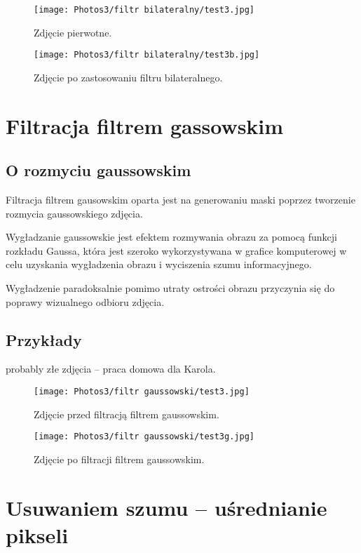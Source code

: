 \documentclass[]{mwart}
\begin{document}
\begin{figure}[H]
    \centering
    \texttt{[image: Photos3/filtr bilateralny/test3.jpg]}
    \caption{Zdjęcie pierwotne.}
\end{figure}
\begin{figure}[H]
    \centering
    \texttt{[image: Photos3/filtr bilateralny/test3b.jpg]}
    \caption{Zdjęcie po zastosowaniu filtru bilateralnego.}
\end{figure}






\section{Filtracja filtrem gassowskim           }
\subsection{O rozmyciu gaussowskim}
Filtracja filtrem gausowskim oparta jest na generowaniu maski poprzez tworzenie rozmycia gaussowskiego zdjęcia.

Wygładzanie gaussowskie jest efektem rozmywania obrazu za pomocą funkcji rozkładu Gaussa,
która jest szeroko wykorzystywana w grafice komputerowej w celu uzyskania wygładzenia obrazu i wyciszenia szumu informacyjnego.

Wygładzenie paradoksalnie pomimo utraty ostrości obrazu przyczynia się do poprawy wizualnego odbioru zdjęcia.

\subsection{Przykłady}
probably złe zdjęcia -- praca domowa dla Karola.

\begin{figure}[H]
    \centering
    \texttt{[image: Photos3/filtr gaussowski/test3.jpg]}
    \caption{Zdjęcie przed filtracją filtrem gaussowskim.}
\end{figure}
\begin{figure}[H]
    \centering
    \texttt{[image: Photos3/filtr gaussowski/test3g.jpg]}
    \caption{Zdjęcie po filtracji filtrem gaussowskim.}
\end{figure}






\section{Usuwaniem szumu -- uśrednianie pikseli}
\end{document}
